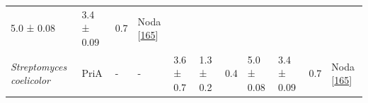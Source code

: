 \documentclass[12pt,twoside]{reedthesis}
\begin{document}
\begin{longtable}[]{@{}lllllllllll@{}}
\begin{minipage}[t]{0.05\columnwidth}
  5.0 ± 0.08\strut
  \end{minipage} & \begin{minipage}[t]{0.05\columnwidth}\raggedright\strut
  3.4 ± 0.09\strut
  \end{minipage} & \begin{minipage}[t]{0.03\columnwidth}\raggedright\strut
  0.7\strut
  \end{minipage} & \begin{minipage}[t]{0.11\columnwidth}\raggedright\strut
  Noda
  {[}\protect\hyperlink{ref-noda-garcia_identification_2010}{165}{]}\strut
  \end{minipage}\tabularnewline
  \begin{minipage}[t]{0.15\columnwidth}\raggedright\strut
  \emph{Streptomyces coelicolor}\strut
  \end{minipage} & \begin{minipage}[t]{0.05\columnwidth}\raggedright\strut
  PriA\strut
  \end{minipage} & \begin{minipage}[t]{0.04\columnwidth}\raggedright\strut
  -\strut
  \end{minipage} & \begin{minipage}[t]{0.04\columnwidth}\raggedright\strut
  -\strut
  \end{minipage} & \begin{minipage}[t]{0.06\columnwidth}\raggedright\strut
  3.6 ± 0.7\strut
  \end{minipage} & \begin{minipage}[t]{0.06\columnwidth}\raggedright\strut
  1.3 ± 0.2\strut
  \end{minipage} & \begin{minipage}[t]{0.06\columnwidth}\raggedright\strut
  0.4\strut
  \end{minipage} & \begin{minipage}[t]{0.05\columnwidth}\raggedright\strut
  5.0 ± 0.08\strut
  \end{minipage} & \begin{minipage}[t]{0.05\columnwidth}\raggedright\strut
  3.4 ± 0.09\strut
  \end{minipage} & \begin{minipage}[t]{0.03\columnwidth}\raggedright\strut
  0.7\strut
  \end{minipage} & \begin{minipage}[t]{0.11\columnwidth}\raggedright\strut
  Noda
  {[}\protect\hyperlink{ref-noda-garcia_identification_2010}{165}{]}\strut
  \end{minipage}\tabularnewline

\end{longtable}
\end{document}
